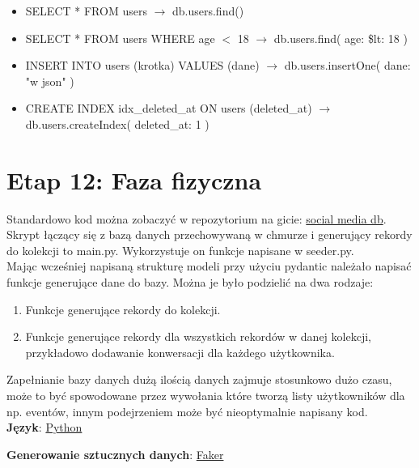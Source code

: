 \documentclass{article}
\begin{document}
\begin{itemize}
    \item SELECT * FROM users $\rightarrow$ db.users.find()
    \item SELECT * FROM users WHERE age $<$ 18 $\rightarrow$ db.users.find({ age: { \$lt: 18 } })
    \item INSERT INTO users (krotka) VALUES (dane) $\rightarrow$ db.users.insertOne({ dane: "w json" })
    \item CREATE INDEX idx\_deleted\_at ON users (deleted\_at) $\rightarrow$ db.users.createIndex({ deleted\_at: 1 })
\end{itemize}

\section{Etap 12: Faza fizyczna }

\quad Standardowo kod można zobaczyć w repozytorium na gicie: \href{https://github.com/lukaszfabia/social_media_db}{social media db}. Skrypt łączący się z bazą danych przechowywaną w chmurze i generujący rekordy do kolekcji to main.py. Wykorzystuje on funkcje napisane w seeder.py.\\

\quad Mając wcześniej napisaną strukturę modeli przy użyciu pydantic należało napisać funkcje generujące dane do bazy. Można je było podzielić na dwa rodzaje:

\begin{enumerate}
    \item Funkcje generujące rekordy do kolekcji.
    \item Funkcje generujące rekordy dla wszystkich rekordów w danej kolekcji, przykładowo dodawanie konwersacji dla każdego użytkownika.
\end{enumerate}

Zapełnianie bazy danych dużą ilością danych zajmuje stosunkowo dużo czasu, może to być spowodowane przez wywołania które tworzą listy użytkowników dla np. eventów, innym podejrzeniem może być nieoptymalnie napisany kod. \\


\textbf{Język}: \href{https://www.python.org/}{Python}

\textbf{Generowanie sztucznych danych}: \href{https://faker.readthedocs.io/en/master/}{Faker}




\end{document}

